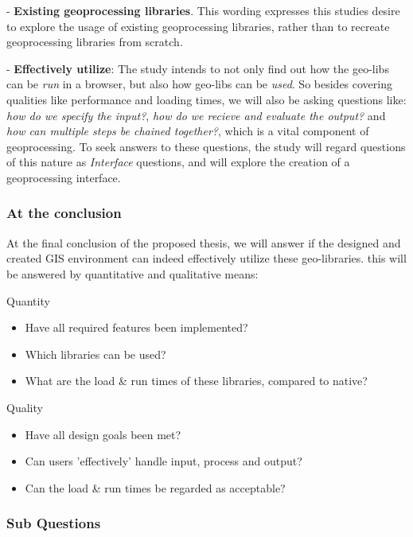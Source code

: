 - \textbf{Existing geoprocessing libraries}. This wording expresses this studies desire to explore the usage of existing geoprocessing libraries, rather than to recreate geoprocessing libraries from scratch.

- \textbf{Effectively utilize}: The study intends to not only find out how the geo-libs can be \textit{run} in a browser, but also how geo-libs can be \textit{used}. So besides covering qualities like performance and loading times, we will also be asking questions like: \textit{how do we specify the input?}, \textit{how do we recieve and evaluate the output?} and \textit{how can multiple steps be chained together?}, which is a vital component of geoprocessing. To seek answers to these questions, the study will regard questions of this nature as \textit{Interface} questions, and will explore the creation of a geoprocessing interface. 

\subsubsection*{At the conclusion}

At the final conclusion of the proposed thesis, we will answer if the designed and created GIS environment can indeed effectively utilize these geo-libraries.
this will be answered by quantitative and qualitative means:

Quantity
\begin{itemize}
    \item Have all required features been implemented?
    \item Which libraries can be used?
    \item What are the load \& run times of these libraries, compared to native?
\end{itemize} 

Quality
\begin{itemize}
    \item Have all design goals been met?
    \item Can users 'effectively' handle input, process and output?
    \item Can the load \& run times be regarded as acceptable? 
\end{itemize} 


\subsubsection*{Sub Questions}

